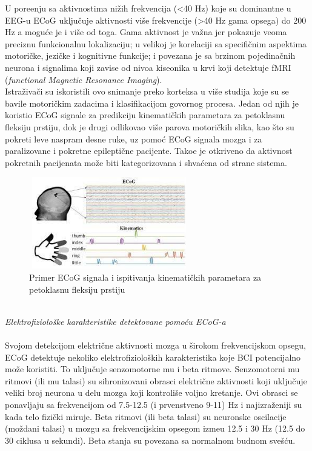 \documentclass[conference]{IEEEtran}
\begin{document}
U pore\dj enju sa aktivnostima nižih frekvencija (<40 Hz) koje su dominantne u EEG-u ECoG uključuje aktivnosti više frekvencije (>40 Hz gama opsega) do 200 Hz a moguće je i više od toga. Gama aktivnost je važna jer pokazuje veoma preciznu funkcionalnu lokalizaciju; u velikoj je korelaciji sa specifičnim aspektima motoričke, jezičke i kognitivne funkcije; i povezana je sa brzinom pojedinačnih neurona i signalima koji zavise od nivoa kiseonika u krvi koji detektuje fMRI (\textit{functional Magnetic Resonance Imaging}).\\
Istraživači su iskoristili ovo snimanje preko korteksa u više studija koje su se bavile motoričkim zadacima i klasifikacijom govornog procesa. Jedan od njih je koristio ECoG signale za predikciju kinematičkih parametara za petoklasnu fleksiju prstiju, dok je drugi odlikovao više parova motoričkih slika, kao što su pokreti leve naspram desne ruke, uz pomoć ECoG signala mozga i za paralizovane i pokretne epileptične pacijente. Tako\dj e je otkriveno da aktivnost pokretnih pacijenata može biti kategorizovana i shvaćena od strane sistema. 
\begin{figure}[htp]
\centerline{\includegraphics[width=7cm, height=4cm]{kontrola prst.jpg}}
\caption{Primer ECoG signala i ispitivanja kinematičkih parametara za petoklasnu fleksiju prstiju}
\label{Slika}
\end{figure}
\\
\textit{Elektrofiziološke karakteristike detektovane pomoću ECoG-a} \\
\\
Svojom detekcijom električne aktivnosti mozga u širokom frekvencijskom opsegu, ECoG detektuje nekoliko elektrofizioloških karakteristika koje BCI potencijalno može koristiti. To uključuje senzomotorne mu i beta ritmove. Senzomotorni mu ritmovi (ili mu talasi) su sihronizovani obrasci električne aktivnosti koji uključuje veliki broj neurona u delu mozga koji kontroliše voljno kretanje. Ovi obrasci se ponavljaju sa frekvencijom od 7.5-12.5 (i prvenstveno 9-11) Hz i najizraženiji su kada telo fizički miruje. Beta ritmovi (ili beta talasi) su neuronske oscilacije (moždani talasi) u mozgu sa frekvencijskim opsegom izme\dj u 12.5 i 30 Hz (12.5 do 30 ciklusa u sekundi). Beta stanja su povezana sa normalnom budnom svešću. \\
\end{document}
